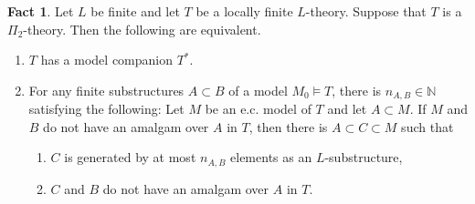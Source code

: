 \documentclass[11pt,reqno]{article}
\theoremstyle{definition}
\newtheorem{fact}[theorem]{Fact}
\theoremstyle{remark}
\begin{document}
\begin{fact}\label{fact:locally finiteness and model companion}
    Let $L$ be finite and let $T$ be a locally finite $L$-theory.
    Suppose that $T$ is a $\Pi_2$-theory.
    Then the following are equivalent.
    \begin{enumerate}
        \item $T$ has a model companion $T^*$.
        \item For any finite substructures $A\subset B$ of a model $M_0\models T$, there is $n_{A,B}\in \mathbb N$ satisfying the following: 
        Let $M$ be an e.c. model of $T$ and let $A\subset M$. 
        If $M$ and $B$ do not have an amalgam over $A$ in $T$, then there is $A\subset C\subset M$ such that
        \begin{enumerate}
            \item $C$ is generated by at most $n_{A,B}$ elements as an $L$-substructure,
            \item $C$ and $B$ do not have an amalgam over $A$ in $T$.
        \end{enumerate}   
    \end{enumerate}
\end{fact}
\end{document}
